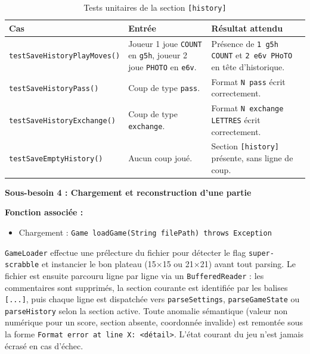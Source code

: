 \documentclass[a4paper]{article}
\begin{document}
\begin{samepage}
\begin{table}[H]
    \centering
    \small
    \begin{tabular}{p{4.5cm} p{4.5cm} p{5.5cm}}
        \toprule
        \textbf{Cas} & \textbf{Entrée} & \textbf{Résultat attendu} \\
        \midrule
        \texttt{testSaveHistoryPlayMoves()} & Joueur 1 joue \texttt{COUNT} en \texttt{g5h}, joueur 2 joue \texttt{PHOTO} en \texttt{e6v}. & Présence de \texttt{1 g5h COUNT} et \texttt{2 e6v PHoTO} en tête d'historique. \\
        \midrule
        \texttt{testSaveHistoryPass()} & Coup de type \texttt{pass}. & Format \texttt{N pass} écrit correctement. \\
        \midrule
        \texttt{testSaveHistoryExchange()} & Coup de type \texttt{exchange}. & Format \texttt{N exchange LETTRES} écrit correctement. \\
        \midrule
        \texttt{testSaveEmptyHistory()} & Aucun coup joué. & Section \texttt{[history]} présente, sans ligne de coup. \\
        \bottomrule
    \end{tabular}
    \caption{Tests unitaires de la section \texttt{[history]}}
\end{table}

\begin{besoinbox}
    \textbf{\large Sous-besoin 4 : Chargement et reconstruction d'une partie}

    \vspace{2mm}
    \textbf{Fonction associée :}
    \begin{itemize}
        \item Chargement : \texttt{Game loadGame(String filePath) throws Exception}
    \end{itemize}
    \vspace{2mm}

    \texttt{GameLoader} effectue une prélecture du fichier pour détecter le flag \texttt{super-scrabble} et instancier le bon plateau (15$\times$15 ou 21$\times$21) avant tout parsing. Le fichier est ensuite parcouru ligne par ligne via un \texttt{BufferedReader} : les commentaires sont supprimés, la section courante est identifiée par les balises \texttt{[...]}, puis chaque ligne est dispatchée vers \texttt{parseSettings}, \texttt{parseGameState} ou \texttt{parseHistory} selon la section active. Toute anomalie sémantique (valeur non numérique pour un score, section absente, coordonnée invalide) est remontée sous la forme \texttt{Format error at line X: <détail>}. L'état courant du jeu n'est jamais écrasé en cas d'échec.


\end{besoinbox}
\end{samepage}
\end{document}
